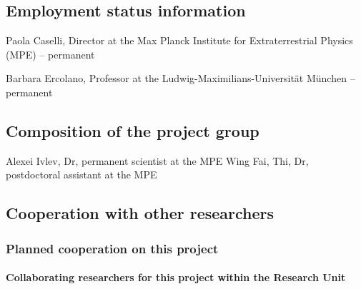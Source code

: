 \documentclass[10pt,fleqn,twoside]{article}
\begin{document}
\subsection{Employment status information}

Paola Caselli, Director at the Max Planck Institute for Extraterrestrial Physics (MPE) -- permanent 

Barbara Ercolano, Professor at the Ludwig-Maximilians-Universit\"at
M\"unchen -- permanent



\subsection{Composition of the project group}

Alexei Ivlev, Dr, permanent scientist at the MPE 
Wing Fai, Thi, Dr, postdoctoral assistant at the MPE

\subsection{Cooperation with other researchers}

\subsubsection{Planned cooperation on this project}

\paragraph{Collaborating researchers for this project within the
  Research Unit}
\end{document}
